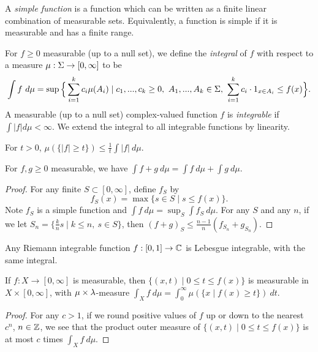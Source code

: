 \documentclass[letterpaper,11pt]{report}
\begin{document}
\begin{defn} A \emph{simple function} is a function which can be written as a finite linear combination of measurable sets. Equivalently, a function is simple if it is measurable and has a finite range.
\end{defn}

\begin{defn} For $f \ge 0$ measurable (up to a null set), we define the \emph{integral} of $f$ with respect to a measure $\mu:\Sigma\rightarrow [0,\infty]$ to be
\[
\int f\ d\mu = \sup\Big\{\sum_{i = 1}^k c_i\mu(A_i) \mid c_1, ..., c_k \ge 0,\ A_1, ..., A_k \in \Sigma,\ \sum_{i=1}^k c_i\cdot 1_{x \in A_i} \le f(x)\Big\}.
\]
A measurable (up to a null set) complex-valued function $f$ is \emph{integrable} if $\int |f| d\mu < \infty$. We extend the integral to all integrable functions by linearity.
\end{defn}

\begin{thm}\label{markov} For $t > 0$, $\mu(\{|f| \ge t\}) \le \frac{1}{t}\int |f|\ d\mu$.
\end{thm}

\begin{prop} For $f,g \ge 0$ measurable, we have $\int f+g\ d\mu = \int f\ d\mu + \int g\ d\mu$.
\end{prop}
\begin{proof} For any finite $S \subset [0,\infty]$, define $f_S$ by
\[
f_S(x) = \max \{s \in S \mid s \le f(x)\}.
\]
Note $f_S$ is a simple function and $\int f\ d\mu = \sup_S \int f_S\ d\mu$. For any $S$ and any $n$, if we let $S_n = \{\frac{k}{n}s\mid k \le n,\ s\in S\}$, then $(f+g)_S \le \frac{n-1}{n}(f_{S_n}+g_{S_n})$.
\end{proof}

\begin{prop} Any Riemann integrable function $f:[0,1] \rightarrow \mathbb{C}$ is Lebesgue integrable, with the same integral.
\end{prop}

\begin{prop} If $f:X \rightarrow [0,\infty]$ is measurable, then $\{(x,t) \mid 0 \le t \le f(x)\}$ is measurable in $X\times [0,\infty]$, with $\mu\times\lambda$-measure $\int_X f\ d\mu = \int_0^\infty \mu(\{x \mid f(x) \ge t\})\ dt$.
\end{prop}
\begin{proof} For any $c > 1$, if we round positive values of $f$ up or down to the nearest $c^n$, $n \in \mathbb{Z}$, we see that the product outer measure of $\{(x,t) \mid 0 \le t \le f(x)\}$ is at most $c$ times $\int_X f\ d\mu$.
\end{proof}
\end{document}
